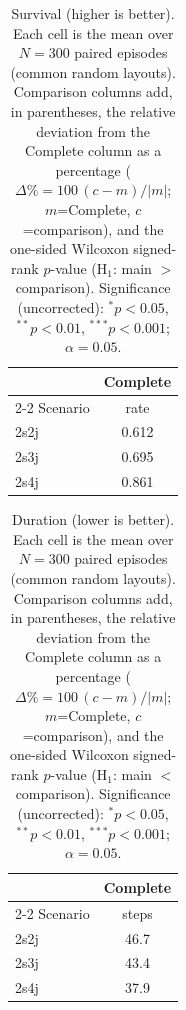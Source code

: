 \begin{table}[ht]
  \centering
  \caption{Survival (higher is better). Each cell is the mean over $N=300$ paired episodes (common random layouts). Comparison columns add, in parentheses, the relative deviation from the Complete column as a percentage ($\Delta\%=100\,(c-m)/|m|$; $m$=Complete, $c$=comparison), and the one-sided Wilcoxon signed-rank $p$-value (H$_1$: main $>$ comparison). Significance (uncorrected): $^{*}p<0.05$, $^{**}p<0.01$, $^{***}p<0.001$; $\alpha=0.05$.}
  \label{tab:wilcoxon-survival}
  \small
  \begin{tabular}{l c}
    \toprule
     & Complete \\
    \cmidrule(lr){2-2}
    Scenario & {rate} \\
    \midrule
    2s2j & 0.612 \\
    2s3j & 0.695 \\
    2s4j & 0.861 \\
    \bottomrule
  \end{tabular}
\end{table}

\begin{table}[ht]
  \centering
  \caption{Duration (lower is better). Each cell is the mean over $N=300$ paired episodes (common random layouts). Comparison columns add, in parentheses, the relative deviation from the Complete column as a percentage ($\Delta\%=100\,(c-m)/|m|$; $m$=Complete, $c$=comparison), and the one-sided Wilcoxon signed-rank $p$-value (H$_1$: main $<$ comparison). Significance (uncorrected): $^{*}p<0.05$, $^{**}p<0.01$, $^{***}p<0.001$; $\alpha=0.05$.}
  \label{tab:wilcoxon-duration}
  \small
  \begin{tabular}{l c}
    \toprule
     & Complete \\
    \cmidrule(lr){2-2}
    Scenario & {steps} \\
    \midrule
    2s2j & 46.7 \\
    2s3j & 43.4 \\
    2s4j & 37.9 \\
    \bottomrule
  \end{tabular}
\end{table}

